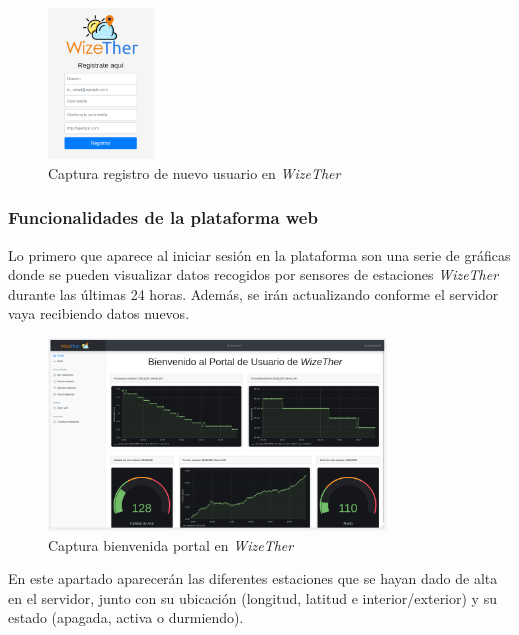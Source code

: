 \documentclass[12pt]{article}
\begin{document}
\begin{figure}[h]
	\begin{center}
		\includegraphics[width=0.25\textwidth]{img_rani/registro.png}
		\caption{Captura registro de nuevo usuario en \textit{WizeTher}}
	\end{center}
\end{figure}

\pagebreak

\subsubsection{Funcionalidades de la plataforma web}

Lo primero que aparece al iniciar sesión en la plataforma son una serie de gráficas donde se pueden visualizar datos recogidos por sensores de estaciones \textit{WizeTher} durante las últimas 24 horas. Además, se irán actualizando conforme el servidor vaya recibiendo datos nuevos. 

\begin{figure}[h]
	\begin{center}
		\includegraphics[width=0.8\textwidth]{img_rani/dashboard_user.png}
		\caption{Captura bienvenida portal en \textit{WizeTher}}
	\end{center}
\end{figure}

\pagebreak

\noindent En este apartado aparecerán las diferentes estaciones que se hayan dado de alta en el servidor, junto con su ubicación (longitud, latitud e interior/exterior) y su estado (apagada, activa o durmiendo).
\end{document}
